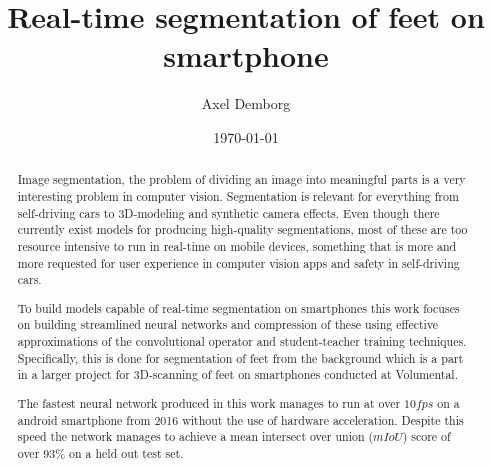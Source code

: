 \documentclass{kththesis}
\title{Real-time segmentation of feet on smartphone}
\author{Axel Demborg}
\date{\today}
\begin{document}
\listoftodos

\frontmatter

\titlepage

\begin{abstract}

  Image segmentation, the problem of dividing an image into meaningful parts is a
  very interesting problem in computer vision. Segmentation is relevant for
  everything from self-driving cars to 3D-modeling and synthetic camera effects.
  Even though there currently exist models for producing high-quality
  segmentations, most of these are too resource intensive to run in real-time on
  mobile devices, something that is more and more requested for user experience
  in computer vision apps and safety in self-driving cars.

  To build models capable of real-time segmentation on smartphones this work
  focuses on building streamlined neural networks and compression of these using
  effective approximations of the convolutional operator and student-teacher
  training techniques. Specifically, this is
  done for segmentation of feet from the background which is a part in a larger
  project for 3D-scanning of feet on smartphones conducted at Volumental.

  The fastest neural network produced in this work manages to run at over \(10
  fps\) on a android smartphone from 2016 without the use of hardware
  acceleration. Despite this speed the network manages to achieve a mean
  intersect over union (\(mIoU\)) score of over \(93\%\) on a held out test set.

\end{abstract}
\end{document}
